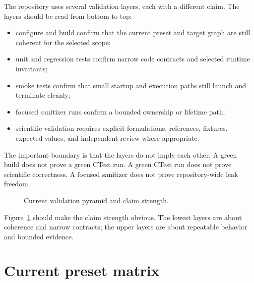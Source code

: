 The repository uses several validation layers, each with a different claim.
The layers should be read from bottom to top:
\begin{itemize}
\item configure and build confirm that the current preset and target graph are
still coherent for the selected scope;
\item unit and regression tests confirm narrow code contracts and selected
runtime invariants;
\item smoke tests confirm that small startup and execution paths still launch
and terminate cleanly;
\item focused sanitizer runs confirm a bounded ownership or lifetime path;
\item scientific validation requires explicit formulations, references,
fixtures, expected values, and independent review where appropriate.
\end{itemize}

The important boundary is that the layers do not imply each other. A green
build does not prove a green CTest run. A green CTest run does not prove
scientific correctness. A focused sanitizer does not prove repository-wide leak
freedom.

\begin{figure}[htbp]
\centering
\caption{Current validation pyramid and claim strength.}
\label{fig:test-pyramid}
\end{figure}

Figure~\ref{fig:test-pyramid} should make the claim strength obvious. The
lowest layers are about coherence and narrow contracts; the upper layers are
about repeatable behavior and bounded evidence.

\section{Current preset matrix}
\label{sec:test-current-preset-matrix}

